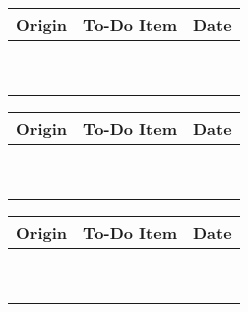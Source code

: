 \documentclass{article}
\begin{document}
\noindent
\hypertarget{todolist}{}
\begin{tabular}
{p{}|p{}|p{}}
\hline
\textbf{Origin} & \textbf{To-Do Item} & \textbf{Date} \\ 
\hline
 & & \\[10mm] %
\hline
 & & \\[10mm] 
\hline
 & & \\[10mm] 
\hline
 & & \\[10mm] 
\hline
 & & \\[10mm] 
\hline
 & & \\[10mm] 
\hline
 & & \\[10mm] 
\hline
 & & \\[10mm] 
\hline
 & & \\[10mm] 
\hline
\end{tabular}
\newpage
\noindent
\begin{tabular}
{p{}|p{}|p{}}
\hline
\textbf{Origin} & \textbf{To-Do Item} & \textbf{Date} \\ 
\hline
 & & \\[10mm] %
\hline
 & & \\[10mm] 
\hline
 & & \\[10mm] 
\hline
 & & \\[10mm] 
\hline
 & & \\[10mm] 
\hline
 & & \\[10mm] 
\hline
 & & \\[10mm] 
\hline
 & & \\[10mm] 
\hline
 & & \\[10mm] 
\hline
\end{tabular}
\newpage
\noindent
\begin{tabular}
{p{}|p{}|p{}}
\hline
\textbf{Origin} & \textbf{To-Do Item} & \textbf{Date} \\ 
\hline
 & & \\[10mm] %
\hline
 & & \\[10mm] 
\hline
 & & \\[10mm] 
\hline
 & & \\[10mm] 
\hline
 & & \\[10mm] 
\hline
 & & \\[10mm] 
\hline
 & & \\[10mm] 
\hline
 & & \\[10mm] 
\hline
 & & \\[10mm] 
\hline
\end{tabular}
\newpage
\end{document}
